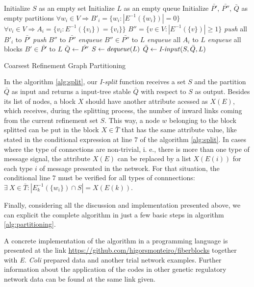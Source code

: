 \documentclass[12pt]{diazessay} %
\begin{document}
\begin{algorithm}[!t]
	\SetAlgoLined
	Initialize $S$ as an empty set\;
	Initialize $L$ as an empty queue\;
	Initialize $\bar{P'}$, $\bar{P''}$, $\bar{Q}$ as empty partitions\;
	$\forall w_i \in V \Rightarrow B'_{i} = \{ w_i : |E^{-1}(\{w_i\})|=0 \}$\;
	$\forall v_i \in V \Rightarrow A_i = \{ v_i : E^{-1}(\{v_i\}) = \{v_i\} \}$\;
	$B'' = \{ v \in V : |E^{-1}(\{v\})| \geq 1 \}$\;
	\textit{push} all $B'_{i}$ to $\bar{P'}$\;
	\textit{push} $B''$ to $\bar{P''}$\;
	\textit{enqueue} $B'' \in \bar{P''}$ to $L$\;
	\textit{enqueue} all $A_i$ to $L$\;
	\textit{enqueue} all blocks $B' \in \bar{P'}$ to $L$\;
	$\bar{Q} \leftarrow \bar{P''}$\;
	{
		$S \leftarrow \text{\textit{dequeue}}(L)$\;
		$\bar{Q} \leftarrow \text{\textit{I-input}}(S, \bar{Q}, L)$
	}
	\caption{Coarsest Refinement Graph Partitioning}
	\label{alg:partitioning}
\end{algorithm}

In the algorithm \ref{alg:split}, our \textit{I-split} function receives a set $S$ and the partition $\bar{Q}$ as input and returns a input-tree stable $\bar{Q}$ with respect to $S$ as output. Besides its list of nodes, a block $X$ should have another attribute acessed as $X(E)$, which receives, during the splitting process, the number of inward links coming from the current refinement set $S$. This way, a node $w$ belonging to the block splitted can be put in the block $X \in \bar{T}$ that has the same attribute value, like stated in the conditional expression at line $7$ of the algorithm \ref{alg:split}. In cases where the type of connections are non-trivial, i. e., there is more than one type of message signal, the attribute $X(E)$ can be replaced by a list $X(E(i))$ for each type $i$ of message presented in the network. For that situation, the conditional line $7$ must be verified for all types of connnections: $\exists \ X \in \bar{T} : | E_k^{-1}(\{w_i\})\cap S | = X(E(k))$.


Finally, considering all the discussion and implementation presented above, we can explicit the complete algorithm in just a few basic steps in algorithm \ref{alg:partitioning}.

A concrete implementation of the algorithm in a programming language is presented at the link \url{https://github.com/higorsmonteiro/fiberblocks} together with \textit{E. Coli} prepared data and another trial network examples. Further information about the application of the codes in other genetic regulatory network data can be found at the same link given.
\end{document}
